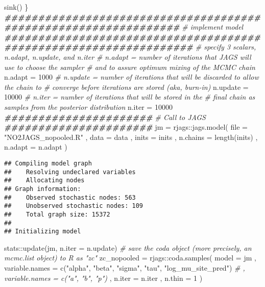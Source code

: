 \documentclass[
]{article}
\newenvironment{Shaded}{\begin{snugshade}}{\end{snugshade}}
\newcommand{\AttributeTok}[1]{\textcolor[rgb]{0.77,0.63,0.00}{#1}}
\newcommand{\CommentTok}[1]{\textcolor[rgb]{0.56,0.35,0.01}{\textit{#1}}}
\newcommand{\DecValTok}[1]{\textcolor[rgb]{0.00,0.00,0.81}{#1}}
\newcommand{\DocumentationTok}[1]{\textcolor[rgb]{0.56,0.35,0.01}{\textbf{\textit{#1}}}}
\newcommand{\FunctionTok}[1]{\textcolor[rgb]{0.00,0.00,0.00}{#1}}
\newcommand{\NormalTok}[1]{#1}
\newcommand{\OtherTok}[1]{\textcolor[rgb]{0.56,0.35,0.01}{#1}}
\newcommand{\SpecialCharTok}[1]{\textcolor[rgb]{0.00,0.00,0.00}{#1}}
\newcommand{\StringTok}[1]{\textcolor[rgb]{0.31,0.60,0.02}{#1}}
\begin{document}
\begin{Shaded}
\begin{Highlighting}[]
  \FunctionTok{sink}\NormalTok{()}
\NormalTok{\}}
\DocumentationTok{\#\#\#\#\#\#\#\#\#\#\#\#\#\#\#\#\#\#\#\#\#\#\#\#\#\#\#\#\#\#\#\#\#\#\#\#\#\#\#\#\#\#\#\#\#\#\#\#\#\#\#\#\#\#\#\#\#\#\#\#\#\#\#\#}
\CommentTok{\# implement model}
\DocumentationTok{\#\#\#\#\#\#\#\#\#\#\#\#\#\#\#\#\#\#\#\#\#\#\#\#\#\#\#\#\#\#\#\#\#\#\#\#\#\#\#\#\#\#\#\#\#\#\#\#\#\#\#\#\#\#\#\#\#\#\#\#\#\#\#\#\#\#}
\CommentTok{\# specify 3 scalars, n.adapt, n.update, and n.iter}
\CommentTok{\# n.adapt = number of iterations that JAGS will use to choose the sampler }
  \CommentTok{\# and to assure optimum mixing of the MCMC chain}
\NormalTok{n.adapt }\OtherTok{=} \DecValTok{1000}
\CommentTok{\# n.update = number of iterations that will be discarded to allow the chain to }
\CommentTok{\#   converge before iterations are stored (aka, burn{-}in)}
\NormalTok{n.update }\OtherTok{=} \DecValTok{10000}
\CommentTok{\# n.iter = number of iterations that will be stored in the }
  \CommentTok{\# final chain as samples from the posterior distribution}
\NormalTok{n.iter }\OtherTok{=} \DecValTok{10000}
\DocumentationTok{\#\#\#\#\#\#\#\#\#\#\#\#\#\#\#\#\#\#\#\#\#\#}
\CommentTok{\# Call to JAGS}
\DocumentationTok{\#\#\#\#\#\#\#\#\#\#\#\#\#\#\#\#\#\#\#\#\#\#}
\NormalTok{jm }\OtherTok{=}\NormalTok{ rjags}\SpecialCharTok{::}\FunctionTok{jags.model}\NormalTok{(}
  \AttributeTok{file =} \StringTok{"NO2JAGS\_nopooled.R"}
\NormalTok{  , }\AttributeTok{data =}\NormalTok{ data}
\NormalTok{  , }\AttributeTok{inits =}\NormalTok{ inits}
\NormalTok{  , }\AttributeTok{n.chains =} \FunctionTok{length}\NormalTok{(inits)}
\NormalTok{  , }\AttributeTok{n.adapt =}\NormalTok{ n.adapt}
\NormalTok{)}
\end{Highlighting}
\end{Shaded}

\begin{verbatim}
## Compiling model graph
##    Resolving undeclared variables
##    Allocating nodes
## Graph information:
##    Observed stochastic nodes: 563
##    Unobserved stochastic nodes: 109
##    Total graph size: 15372
## 
## Initializing model
\end{verbatim}

\begin{Shaded}
\begin{Highlighting}[]
\NormalTok{stats}\SpecialCharTok{::}\FunctionTok{update}\NormalTok{(jm, }\AttributeTok{n.iter =}\NormalTok{ n.update)}
\CommentTok{\# save the coda object (more precisely, an mcmc.list object) to R as "zc"}
\NormalTok{zc\_nopooled }\OtherTok{=}\NormalTok{ rjags}\SpecialCharTok{::}\FunctionTok{coda.samples}\NormalTok{(}
  \AttributeTok{model =}\NormalTok{ jm}
\NormalTok{  , }\AttributeTok{variable.names =} \FunctionTok{c}\NormalTok{(}\StringTok{"alpha"}\NormalTok{, }\StringTok{"beta"}\NormalTok{, }\StringTok{"sigma"}\NormalTok{, }\StringTok{"tau"}\NormalTok{, }\StringTok{"log\_mu\_site\_pred"}\NormalTok{)}
  \CommentTok{\# , variable.names = c("a", "b", "p")}
\NormalTok{  , }\AttributeTok{n.iter =}\NormalTok{ n.iter}
\NormalTok{  , }\AttributeTok{n.thin =} \DecValTok{1}
\NormalTok{)}
\end{Highlighting}
\end{Shaded}
\end{document}
